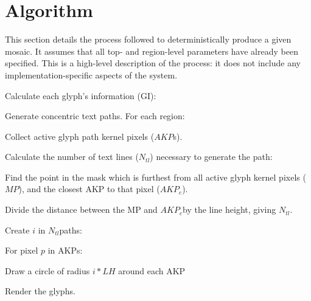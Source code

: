 \newcommand{\ntl}{\(N_{tl}\)}
\newcommand{\akp}{\(AKP\)}
\newcommand{\akpc}{\akp\(_{c}\)}


\section{Algorithm}
\label{apx:algorithm}
This section details the process followed to deterministically produce a given mosaic.
It assumes that all top- and region-level parameters have already been specified.
This is a high-level description of the process: it does not include any implementation-specific aspects of the system.

\begin{deepEnum}
  \item Calculate each glyph's information (GI):
        \begin{deepEnum}
          \item Generate concentric text paths.
                For each region:
                \begin{deepEnum}
                  \item Collect active glyph path kernel pixels (\akp s).
                  \item Calculate the number of text lines (\ntl) necessary to generate the path:
                        \begin{deepEnum}
                          \item Find the point in the mask which is furthest from all active glyph kernel pixels (\(MP\)), and the closest AKP to that pixel (\akpc).
                          \item Divide the distance between the MP and \akpc\space by the line height, giving \ntl.
                        \end{deepEnum}
                  \item Create \(i\) in \ntl\space paths:
                        \begin{deepEnum}
                          \item For pixel \(p\) in AKPs:
                          \begin{deepEnum}
                            \item Draw a circle of radius \(i * LH\) around each AKP
                          \end{deepEnum}
                        \end{deepEnum}
                \end{deepEnum}
        \end{deepEnum}
  \item Render the glyphs.
\end{deepEnum}